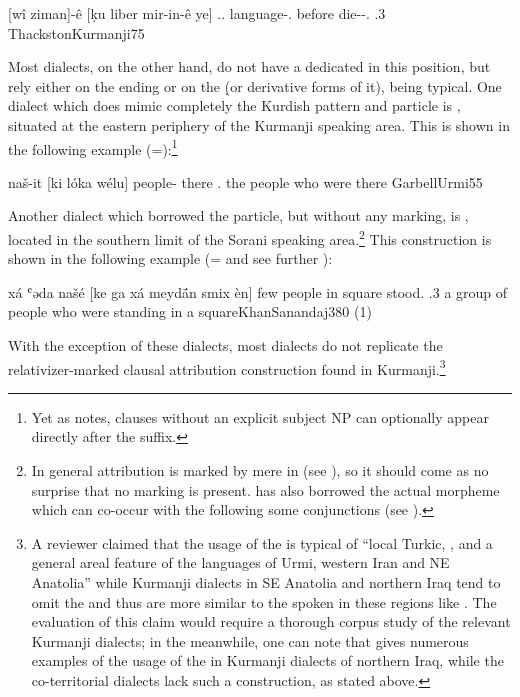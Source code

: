 {[wî ziman]-ê [ḳu li\cb{}ber mir-in-ê ye]}
{\dem.\far.\obl{} language-\ez.\masc{} \rel{} before die-\inf-\obl.\fem{} \cop.3\sg}
{}
{ThackstonKurmanji}{75}\antipar

\newpage 


Most  dialects, on the other hand, do not have a dedicated  in this position, but rely either on the \cst* ending or on the \lnk* \d (or derivative forms of it),  being typical. One dialect which does mimic completely the Kurdish pattern and particle is \JUrm, situated at the eastern periphery of the Kurmanji speaking area. This is shown in the following example (=):\footnote{Yet as \citet[88]{GarbellUrmi} notes, clauses without an explicit subject NP can optionally appear directly after the \cst* suffix.}

{naš-it [ki lóka wélu]}
{people-\cst{} \rel{} there \cop.\pl}
{the people who were there}
{GarbellUrmi}{55}

Another dialect which borrowed the particle, but without any  marking, is  \JSan, located in the southern limit of the Sorani speaking area.\footnote{In general attribution is marked by mere  in \JSan (see ), so it should come as no surprise that no \cst* marking is present. \JSan has also borrowed the actual  \ez* morpheme which can co-occur with the  following some conjunctions (see ).} This construction is shown in the following example (= and see further ):

{xá\cb{} ʿəda našé [ke\cb{} ga\cb{} xá meydā́n smix \cb{}èn]}
{\indef\cb{} few people \rel\cb{} in\cb{} \indef{} square stood.\resl{} \cb{}\cop.3\pl}
{a group of people who were standing in a square}{KhanSanandaj}{380 (1)}

With the exception of these dialects, most  dialects do not replicate the relativizer-marked clausal attribution construction found in Kurmanji.\footnote{A reviewer claimed that the usage of the  is typical of \enquote{local Turkic, , and a general areal feature of the languages of Urmi, western Iran and NE Anatolia} while Kurmanji dialects in SE Anatolia and northern Iraq tend to omit the \rel* and thus are more similar to the  spoken in these regions like \JZax. The evaluation of this claim would require a thorough corpus study of the relevant Kurmanji dialects; in the meanwhile, one can note that \citet[203]{MacKenzie} gives numerous examples of the usage of the  in Kurmanji dialects of northern Iraq, while the co-territorial  dialects lack such a construction, as stated above.}


